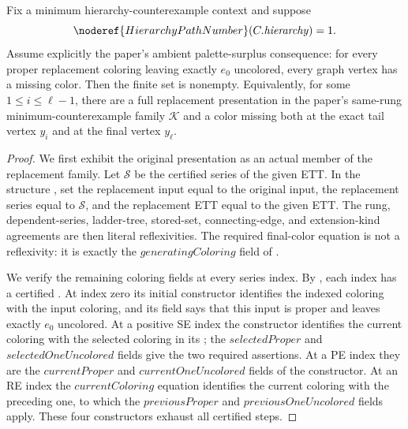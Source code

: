 \begin{lemma}
Fix a minimum hierarchy-counterexample context and suppose
\[
 \noderef{HierarchyPathNumber}(C.\mathit{hierarchy})=1.
\]
Assume explicitly the paper's ambient palette-surplus consequence: for
every proper replacement coloring leaving exactly \(e_0\) uncolored,
every graph vertex has a missing color.  Then the finite set
 is nonempty.  Equivalently,
for some \(1\leq i\leq\ell-1\), there are a full replacement presentation
in the paper's same-rung minimum-counterexample family \(\mathcal K\) and
a color missing both at the exact tail vertex \(y_i\) and at the final
vertex \(y_\ell\).
\end{lemma}
\begin{proof}
We first exhibit the original presentation as an actual member of the
replacement family.  Let \(\mathcal S\) be the certified series of the
given ETT.  In the structure
, set the replacement input
equal to the original input, the replacement series equal to
\(\mathcal S\), and the replacement ETT equal to the given ETT.  The
rung, dependent-series, ladder-tree, stored-set, connecting-edge, and
extension-kind agreements are then literal reflexivities.  The required
final-color equation is not a reflexivity: it is exactly the
\(\mathit{generatingColoring}\) field of
.

We verify the remaining coloring fields at every series index.  By
, each index has a certified
.  At index zero its initial constructor
identifies the indexed coloring with the input coloring, and its
 field says that this input is proper and leaves exactly
\(e_0\) uncolored.  At a positive SE index the constructor identifies the
current coloring with the selected coloring in its
; the
\(\mathit{selectedProper}\) and \(\mathit{selectedOneUncolored}\) fields
give the two required assertions.  At a PE index they are the
\(\mathit{currentProper}\) and \(\mathit{currentOneUncolored}\) fields of
the constructor.  At an RE index the \(\mathit{currentColoring}\) equation
identifies the current coloring with the preceding one, to which the
\(\mathit{previousProper}\) and
\(\mathit{previousOneUncolored}\) fields apply.  These four constructors
exhaust all certified steps.


\end{proof}
